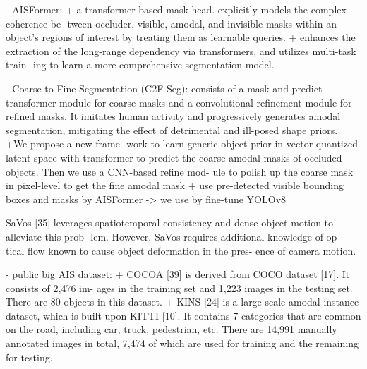 - AISFormer: 
+ a transformer-based mask head. explicitly models the complex coherence be- tween occluder, visible, amodal, and invisible masks within an object’s regions of interest by treating them as learnable queries.
+ enhances the extraction of the long-range dependency via transformers, and utilizes multi-task train- ing to learn a more comprehensive segmentation model.


- Coarse-to-Fine Segmentation (C2F-Seg): consists of a mask-and-predict transformer module for coarse masks and a convolutional refinement module for refined masks. It imitates human activity and progressively generates amodal segmentation, mitigating the effect of detrimental and ill-posed shape priors.
+We propose a new frame- work to learn generic object prior in vector-quantized latent space with transformer to predict the coarse amodal masks of occluded objects. Then we use a CNN-based refine mod- ule to polish up the coarse mask in pixel-level to get the fine amodal mask
+ use pre-detected visible bounding boxes and masks by AISFormer  -> we use by fine-tune YOLOv8


SaVos [35] leverages spatiotemporal consistency and dense object motion to alleviate this prob- lem. However, SaVos requires additional knowledge of op- tical flow known to cause object deformation in the pres- ence of camera motion.

- public big AIS dataset: 
+ COCOA [39] is derived from COCO dataset [17]. It consists of 2,476 im- ages in the training set and 1,223 images in the testing set. There are 80 objects in this dataset. 
+ KINS [24] is a large-scale amodal instance dataset, which is built upon KITTI [10]. It contains 7 categories that are common on the road, including car, truck, pedestrian, etc. There are 14,991 manually annotated images in total, 7,474 of which are used for training and the remaining for testing.